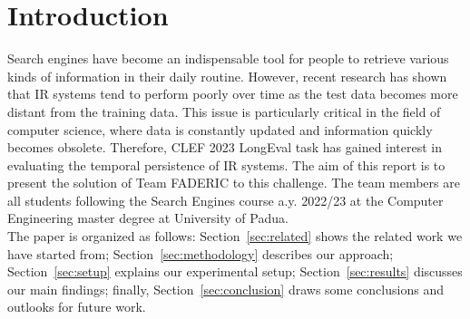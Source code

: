 \section{Introduction}
\label{sec:introduction}

Search engines have become an indispensable tool for people to retrieve various kinds of information in their daily 
routine. However, recent research has shown that \ac{IR} systems tend to perform poorly over time as the test data becomes more distant from the training data. This issue is particularly critical in the field of computer science, where data is constantly updated and information quickly becomes obsolete. Therefore, \ac{CLEF} 2023 LongEval task \cite{longevaloverview2023} has gained interest in evaluating the temporal persistence of \ac{IR} systems. The aim of this report is to present the solution of Team FADERIC to this challenge. The team members are all students following the Search Engines course a.y. 2022/23 at the Computer Engineering master degree at University of Padua. \\The paper is organized as follows: Section~\ref{sec:related} shows the related work we have started from; Section~\ref{sec:methodology} describes our approach; Section~\ref{sec:setup} explains our experimental setup; Section~\ref{sec:results} discusses our main findings; finally, Section~\ref{sec:conclusion} draws some conclusions and outlooks for future work.